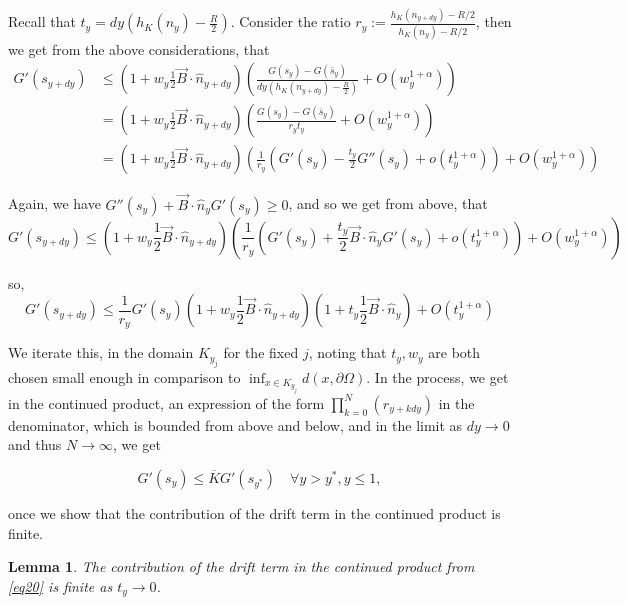 \documentclass{article}
\newcounter{lem}
\theoremstyle{plain}
\newtheorem{lemma}[theorem]{Lemma}
\theoremstyle{definition}
\theoremstyle{plain}
\begin{document}
Recall that $t_y = dy \left( h_K(n_y) - \frac{R}{2} \right)$. 
Consider the ratio $r_y := \frac{h_K(n_{y+dy}) - R/2}{h_K(n_y) - R/2}$, then we get from the above considerations, that
\begin{align*}
G'(s_{y+dy}) &\le \left( 1 + w_y \frac{1}{2} \vec{B} \cdot \hat{n}_{y+dy} \right) \left( \frac{G(s_y) - G(\bar{s}_y)}{dy (h_K(n_{y+dy}) - \frac{R}{2})} + O(w_y^{1+\alpha}) \right) \\
&= \left( 1 + w_y \frac{1}{2} \vec{B} \cdot \hat{n}_{y+dy} \right) \left( \frac{G(s_y) - G(\bar{s}_y)}{r_y t_y} + O(w_y^{1+\alpha}) \right) \\
&= \left( 1 + w_y \frac{1}{2} \vec{B} \cdot \hat{n}_{y+dy} \right) \left( \frac{1}{r_y} (G'(s_y) - \frac{t_y}{2} G''(s_y) + o(t_y^{1+\alpha})) + O(w_y^{1+\alpha}) \right)
\end{align*}

Again, we have $G''(s_y) + \vec{B} \cdot \hat{n}_y G'(s_y) \ge 0$, and so we get from above, that
\begin{equation*}
G'(s_{y+dy}) \le \left( 1 + w_y \frac{1}{2} \vec{B} \cdot \hat{n}_{y+dy} \right) \left( \frac{1}{r_y} (G'(s_y) + \frac{t_y}{2} \vec{B} \cdot \hat{n}_y G'(s_y) + o(t_y^{1+\alpha})) + O(w_y^{1+\alpha}) \right)
\end{equation*}

so,
\begin{equation}\label{eq3000}
G'(s_{y+dy}) \le \frac{1}{r_y} G'(s_y) \left( 1 + w_y \frac{1}{2} \vec{B} \cdot \hat{n}_{y+dy} \right) \left( 1 + t_y \frac{1}{2} \vec{B} \cdot \hat{n}_y \right) + O(t_y^{1+\alpha})
\end{equation}

We iterate this, in the domain $K_{y_j}$ for the fixed $j$, noting
that $t_y, w_y$ are both chosen small enough in comparison to
$\inf_{x \in K_{y_j}} d(x, \partial \Omega)$. In the process, we get in the
continued product, an expression of the form $\prod_{k=0}^{N} (r_{y+kdy})$ in the
denominator, which is bounded from above and below,
and in the limit as $dy \to 0$ and thus $N \to \infty$, we get

\begin{equation} \label{eq20}
G'(s_y) \le \overline{K} G'(s_{y^*}) \quad \forall  y > y^*, y\leq 1,
\end{equation}

once we show that the contribution of the drift term in the continued product is finite.
\begin{lemma}
    The contribution of the drift term in the continued product from \cref{eq20} is finite as $t_y\to 0$.
\end{lemma}
\end{document}
